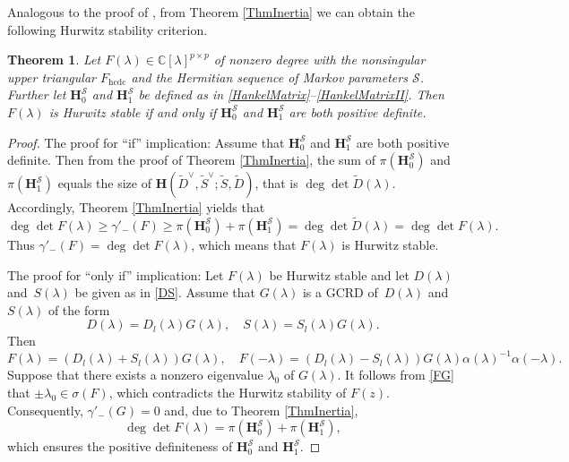 \documentclass[12pt,reqno]{amsart}
\theoremstyle{plain}
\newtheorem{theorem}{Theorem}[section]
\numberwithin{equation}{section}
\theoremstyle{remark}
\def\wtilde{\widetilde} \def\what{\widehat}
\begin{document}
Analogous to the proof of \cite[Theorem 4.4]{XD}, from Theorem \ref{ThmInertia} we can obtain the following Hurwitz stability criterion.
\begin{theorem}\label{ThmHurwitz}
 Let $F(\lambda)\in\mathbb C[\lambda]^{p\times p}$ of nonzero degree with the nonsingular upper triangular $F_{\mathrm{hcdc}}$ and the Hermitian sequence of Markov parameters $\mathscr S$. Further let $
\mathbf{H}_{0}^{\mathscr S}$ and $\mathbf{H}_{1}^{\mathscr S}$ be defined as in \eqref{HankelMatrix}--\eqref{HankelMatrixII}. Then $F(\lambda)$ is Hurwitz stable if and only if  $\mathbf{H}_{0}^{\mathscr S}$ and $\mathbf{H}_{1}^{\mathscr S}$ are both positive definite.
\end{theorem}

\begin{proof}
    The proof for ``if'' implication:  Assume that $\mathbf{H}_{0}^{\mathscr S}$ and $\mathbf{H}_{1}^{\mathscr S}$ are both positive definite. Then from the proof of Theorem \ref{ThmInertia}, the sum of 
    $
    \pi(\mathbf{H}_{0}^{\mathscr S})
    $ and $
    \pi(\mathbf{H}_{1}^{\mathscr S})
    $ equals the size of $\mathbf{H}(\wtilde D^{\vee},\wtilde S^{\vee};\wtilde S,\wtilde D)$, that is $\deg\det \wtilde D(\lambda)$.
      Accordingly, Theorem \ref{ThmInertia} yields that
\begin{equation*}
\deg\det F(\lambda)\geq \gamma'_-(F)\geq \pi(\mathbf{H}_{0}^{\mathscr S})+ \pi(\mathbf{H}_{1}^{\mathscr S})=\deg\det \wtilde D(\lambda)=\deg\det F(\lambda).
\end{equation*}
 Thus $\gamma'_-(F)=\deg\det F(\lambda)$, which means that $F(\lambda)$ is Hurwitz stable.

 The proof for ``only if'' implication: Let $F(\lambda)$ be Hurwitz stable and let $D(\lambda)$ and~$S(\lambda)$ be given as in \eqref{DS}. Assume that $G(\lambda)$ is a GCRD of~$D(\lambda)$ and~$S(\lambda)$ of the form
$$
D(\lambda)=D_l(\lambda)G(\lambda),\quad S(\lambda)=S_l(\lambda)G(\lambda).
$$  
Then
\begin{equation}\label{FG}
F(\lambda)=(D_l(\lambda)+S_l(\lambda))G(\lambda),\quad F(-\lambda)=(D_l(\lambda)-S_l(\lambda))G(\lambda)\alpha(\lambda)^{-1}\alpha(-\lambda).
\end{equation}
Suppose that there exists a nonzero eigenvalue $\lambda_0$ of $G(\lambda)$. It follows from \eqref{FG} that $\pm \lambda_0\in \sigma(F)$, which contradicts the Hurwitz stability of $F(z)$. Consequently, $\gamma'_-(G)=0$ and, due to Theorem \ref{ThmInertia},
$$
\deg\det F(\lambda)=\pi(\mathbf{H}_{0}^{\mathscr S})+ \pi(\mathbf{H}_{1}^{\mathscr S}),
$$
 which ensures the positive definiteness of $\mathbf{H}_{0}^{\mathscr S}$ and $\mathbf{H}_{1}^{\mathscr S}$.

\end{proof}
\end{document}
